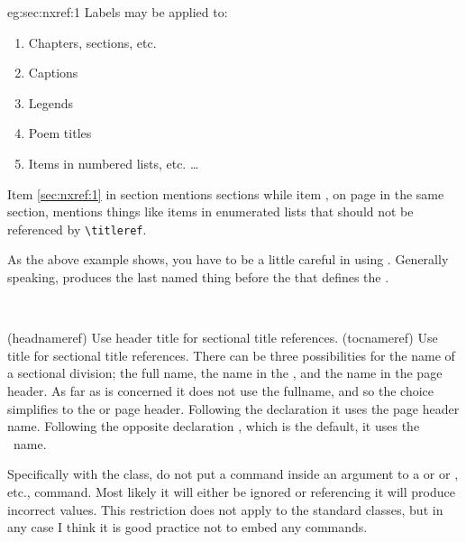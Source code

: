 \begin{egresult}{eg:sec:nxref:1}
Labels may be applied to:
\begin{enumerate}
\item Chapters, sections, etc.            \label{sec:nxref:1}
\item Captions
\item Legends
\item Poem titles
\item Items in numbered lists, etc. \ldots \label{sec:nxref:5}
\end{enumerate}
Item \ref{sec:nxref:1} in section \textit{} 
mentions sections while item 
, on page 
\pageref{sec:nxref:5} in the same section, mentions things like
items in enumerated lists 
that should not be referenced by \verb?\titleref?.
\end{egresult}

    As the above example shows, you have to be a little careful in using
\cmd{\titleref}.
Generally speaking, \cmd{\titleref} produces the last named 
thing before the \cmd{\label} that defines the . 

\begin{syntax}
\cmd{\headnameref} \cmd{\tocnameref} \\
\end{syntax}
\glossary(headnameref)%
  {}%
  {Use header title for sectional title references.}
\glossary(tocnameref)%
  {}%
  {Use \prtoc{} title for sectional title references.}
There can be three possibilities for the name of a sectional division;
the full name, the name in the \toc, and the name in the page header.
As far as \cmd{\titleref} is concerned it does not use the fullname, 
and so the choice simplifies to the \toc{} or page header. Following
the declaration \cmd{\headnameref} it uses the page header name.
Following the opposite declaration \cmd{\tocnameref}, which is the
default, it uses the \toc\ name.

\Note{} Specifically with the  class, 
do not put a \cmd{\label} command inside an
argument to a \cmd{\chapter} or \cmd{\section} or \cmd{\caption}, etc.,
command. Most likely it will either be ignored or referencing it will
produce incorrect values. This restriction does not apply to the standard
classes, but in any case I think it is good practice not to embed any 
\cmd{\label} commands.

